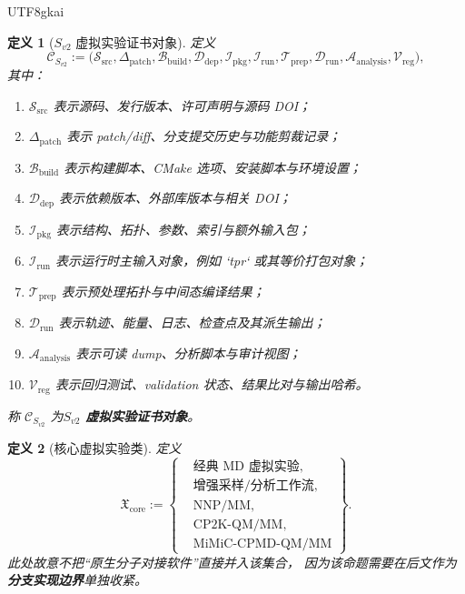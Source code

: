 \documentclass[12pt]{article}
\newtheorem{definition}{定义}[section]
\begin{document}
\begin{CJK*}{UTF8}{gkai}
\begin{definition}[\texorpdfstring{$S_{v2}$}{S-v2} 虚拟实验证书对象]
\label{def:tex39-cert-object}
定义
\[
  \mathcal C_{S_{v2}}
  :=
  \bigl(
    \mathcal S_{\mathrm{src}},
    \Delta_{\mathrm{patch}},
    \mathcal B_{\mathrm{build}},
    \mathcal D_{\mathrm{dep}},
    \mathcal I_{\mathrm{pkg}},
    \mathcal I_{\mathrm{run}},
    \mathcal T_{\mathrm{prep}},
    \mathcal D_{\mathrm{run}},
    \mathcal A_{\mathrm{analysis}},
    \mathcal V_{\mathrm{reg}}
  \bigr),
\]
其中：
\begin{enumerate}
  \item $\mathcal S_{\mathrm{src}}$ 表示源码、发行版本、许可声明与源码 DOI；
  \item $\Delta_{\mathrm{patch}}$ 表示 patch/diff、分支提交历史与功能剪裁记录；
  \item $\mathcal B_{\mathrm{build}}$ 表示构建脚本、CMake 选项、安装脚本与环境设置；
  \item $\mathcal D_{\mathrm{dep}}$ 表示依赖版本、外部库版本与相关 DOI；
  \item $\mathcal I_{\mathrm{pkg}}$ 表示结构、拓扑、参数、索引与额外输入包；
  \item $\mathcal I_{\mathrm{run}}$ 表示运行时主输入对象，例如 `tpr` 或其等价打包对象；
  \item $\mathcal T_{\mathrm{prep}}$ 表示预处理拓扑与中间态编译结果；
  \item $\mathcal D_{\mathrm{run}}$ 表示轨迹、能量、日志、检查点及其派生输出；
  \item $\mathcal A_{\mathrm{analysis}}$ 表示可读 dump、分析脚本与审计视图；
  \item $\mathcal V_{\mathrm{reg}}$ 表示回归测试、validation 状态、结果比对与输出哈希。
\end{enumerate}
称 $\mathcal C_{S_{v2}}$ 为\textbf{\(S_{v2}\) 虚拟实验证书对象}。
\end{definition}

\begin{definition}[核心虚拟实验类]
\label{def:tex39-core-class}
定义
\[
  \mathfrak X_{\mathrm{core}}
  :=
  \left\{
  \begin{aligned}
    &\text{经典 MD 虚拟实验},\\
    &\text{增强采样/分析工作流},\\
    &\text{NNP/MM},\\
    &\text{CP2K-QM/MM},\\
    &\text{MiMiC-CPMD-QM/MM}
  \end{aligned}
  \right\}.
\]
此处故意不把“原生分子对接软件”直接并入该集合，
因为该命题需要在后文作为\textbf{分支实现边界}单独收紧。
\end{definition}


\end{CJK*}
\end{document}
